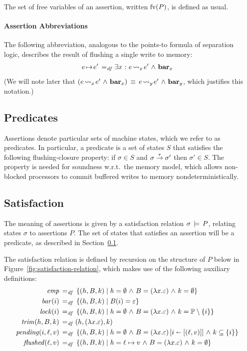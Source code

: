 \documentclass[11pt]{report}
\begin{document}
The set of free variables of an assertion, written $\mathrm{fv}(P)$, is defined as usual. 

\paragraph{Assertion Abbreviations} The following abbreviation, analogous to the points-to formula of separation logic, describes the result of flushing a single write to memory: \begin{align*}
	e \!\mapsto\! e' \operatorname{\;=_{\mathit{df}}\;} & \exists x \operatorname{\,:\,} e \!\leadsto_{x}\! e' \operatorname{\,\wedge\,} \mathbf{bar}_{x}\\
\end{align*} (We will note later that $(e \!\leadsto_{x}\! e' \operatorname{\,\wedge\,} \mathbf{bar}_{x})\,\equiv\, e \!\leadsto_{y}\! e' \operatorname{\,\wedge\,} \mathbf{bar}_{y}$, which justifies this notation.) 

\subsection{Predicates}
\label{sec:predicates}

Assertions denote particular sets of machine states, which we refer to as predicates. In particular, a predicate is a set of states $S$ that satisfies the following flushing-closure property: if $\sigma \in S$ and $\sigma \stackrel{\tau}{\rightarrow} \sigma'$ then $\sigma' \in S$. The property is needed for soundness w.r.t.\ the memory model, which allows non-blocked processors to commit buffered writes to memory nondeterministically.  

\subsection{Satisfaction}

The meaning of assertions is given by a satisfaction relation $\sigma \,\models\, P$, relating states $\sigma$ to assertions $P$. The set of states that satisfies an assertion will be a predicate, as described in Section~\ref{sec:predicates}. 

The satisfaction relation is defined by recursion on the structure of $P$ below in Figure~\ref{fig:satisfaction-relation}, which makes use of the following auxiliary definitions: \begin{align*}
  \mathit{emp} \operatorname{\;=_{\mathit{df}}\;} & \left\lbrace (h,B,k) \mid h = \operatorname{\emptyset} \operatorname{\,\wedge\,} B = (\lambda x.\varepsilon) \operatorname{\,\wedge\,} k = \operatorname{\emptyset} \right\rbrace \\ 
  \mathit{bar}(i) \operatorname{\;=_{\mathit{df}}\;} & \left\lbrace (h,B,k) \mid B(i) = \varepsilon \right\rbrace \\ 
  \mathit{lock}(i) \operatorname{\;=_{\mathit{df}}\;} & \left\lbrace (h,B,k) \mid h = \operatorname{\emptyset} \operatorname{\,\wedge\,} B = (\lambda x.\varepsilon) \operatorname{\,\wedge\,} k = \mathbb{P} \setminus \left\lbrace i \right\rbrace \right\rbrace \\ 
  \mathit{trim}(h,B,k) \operatorname{\;=_{\mathit{df}}\;} & (h,(\lambda x .\varepsilon),k)\\  
  \mathit{pending}(i,\ell,v) \operatorname{\;=_{\mathit{df}}\;} & \left\lbrace (h,B,k) \mid h = \operatorname{\emptyset} \operatorname{\,\wedge\,} B = (\lambda x.\varepsilon) \left[ i \shortleftarrow \left[(\ell,v)\right] \right] \operatorname{\,\wedge\,} k \subseteq \left\lbrace i \right\rbrace \right\rbrace \\ 
  \mathit{flushed}(\ell,v) \operatorname{\;=_{\mathit{df}}\;} & \left\lbrace (h,B,k) \mid h = \ell \mapsto v \operatorname{\,\wedge\,} B = (\lambda x .\varepsilon) \operatorname{\,\wedge\,} k = \operatorname{\emptyset} \right\rbrace 
\end{align*}
\end{document}
